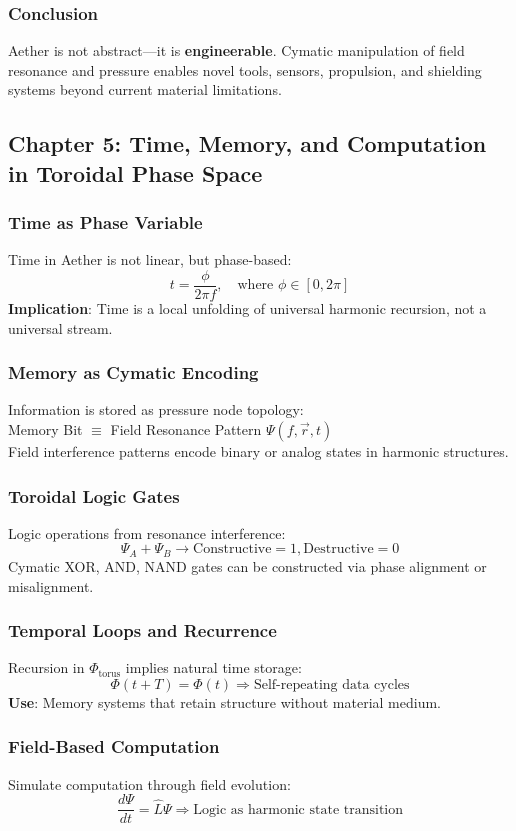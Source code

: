 \subsubsection*{Conclusion}
Aether is not abstract—it is \textbf{engineerable}. Cymatic manipulation of field resonance and pressure enables novel tools, sensors, propulsion, and shielding systems beyond current material limitations.

\subsection{Chapter 5: Time, Memory, and Computation in Toroidal Phase Space}
\subsubsection*{Time as Phase Variable}
Time in Aether is not linear, but phase-based:
\[
t = \frac{\phi}{2 \pi f}, \quad \text{where } \phi \in [0, 2\pi]
\]
\textbf{Implication}: Time is a local unfolding of universal harmonic recursion, not a universal stream.

\subsubsection*{Memory as Cymatic Encoding}
Information is stored as pressure node topology: \\
Memory Bit \( \equiv \) Field Resonance Pattern \( \Psi(f, \vec{r}, t) \) \\
Field interference patterns encode binary or analog states in harmonic structures.

\subsubsection*{Toroidal Logic Gates}
Logic operations from resonance interference:
\[
\Psi_A + \Psi_B \rightarrow \text{Constructive} = 1, \text{Destructive} = 0
\]
Cymatic XOR, AND, NAND gates can be constructed via phase alignment or misalignment.

\subsubsection*{Temporal Loops and Recurrence}
Recursion in \( \Phi_{\text{torus}} \) implies natural time storage:
\[
\Phi(t + T) = \Phi(t) \Rightarrow \text{Self-repeating data cycles}
\]
\textbf{Use}: Memory systems that retain structure without material medium.

\subsubsection*{Field-Based Computation}
Simulate computation through field evolution:
\[
\frac{d \Psi}{d t} = \hat{L} \Psi \Rightarrow \text{Logic as harmonic state transition}
\]

